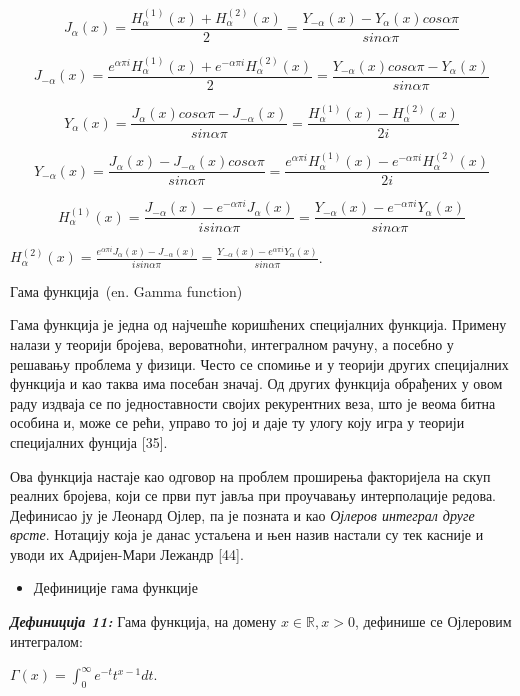 \[J_{\alpha}(x) = \frac{H_{\alpha}^{(1)}(x) + H_{\alpha}^{(2)}(x)}{2} = \frac{Y_{- \alpha}(x) - Y_{\alpha}(x)cos\alpha\pi}{sin\alpha\pi}\]

\[J_{- \alpha}(x) = \frac{e^{\alpha\pi i}H_{\alpha}^{(1)}(x) + e^{- \alpha\pi i}H_{\alpha}^{(2)}(x)}{2} = \frac{Y_{- \alpha}(x)cos\alpha\pi - Y_{\alpha}(x)}{sin\alpha\pi}\]

\[Y_{\alpha}(x) = \frac{J_{\alpha}(x)cos\alpha\pi - J_{- \alpha}(x)}{sin\alpha\pi} = \frac{H_{\alpha}^{(1)}(x) - H_{\alpha}^{(2)}(x)}{2i}\]

\[Y_{- \alpha}(x) = \frac{J_{\alpha}(x) - J_{- \alpha}(x)cos\alpha\pi}{sin\alpha\pi} = \frac{e^{\alpha\pi i}H_{\alpha}^{(1)}(x) - e^{- \alpha\pi i}H_{\alpha}^{(2)}(x)}{2i}\]

\[H_{\alpha}^{(1)}(x) = \frac{J_{- \alpha}(x) - e^{- \alpha\pi i}J_{\alpha}(x)}{isin\alpha\pi} = \frac{Y_{- \alpha}(x) - e^{- \alpha\pi i}Y_{\alpha}(x)}{sin\alpha\pi}\]

\(H_{\alpha}^{(2)}(x) = \frac{e^{\alpha\pi i}J_{\alpha}(x) - J_{- \alpha}(x)}{isin\alpha\pi} = \frac{Y_{- \alpha}(x) - e^{\alpha\pi i}Y_{\alpha}(x)}{sin\alpha\pi}\).

Гама функција~(en. Gamma function)

Гама функција је једна од најчешће коришћених специјалних функција.
Примену налази у теорији бројева, вероватноћи, интегралном рачуну, а
посебно у решавању проблема у физици. Често се спомиње и у теорији
других специјалних функција и као таква има посебан значај. Од других
функција обрађених у овом раду издваја се по једноставности својих
рекурентних веза, што је веома битна особина и, може се рећи, управо то
јој и даје ту улогу коју игра у теорији специјалних фунција {[}35{]}.

Ова функција настаје као одговор на проблем проширења факторијела на
скуп реалних бројева, који се први пут јавља при проучавању
интерполације редова. Дефинисао ју је Леонард Ојлер, па је позната и као
\emph{Ојлеров интеграл друге врсте}. Нотацију која је данас устаљена и
њен назив настали су тек касније и уводи их Адријен-Мари Лежандр
{[}44{]}.

\begin{itemize}
\item
  Дефиниције гама функције
\end{itemize}

\emph{\textbf{Дефиниција 11:}} Гама функција, на домену
\(x\mathbb{\in R,}x > 0\), дефинише се Ојлеровим интегралом:

\(\Gamma(x) = \int_{0}^{\infty}e^{- t}t^{x - 1}dt\).

